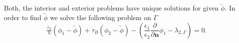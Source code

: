 \begin{itemize}
Both, the interior and exterior problems have unique solutions for given $\widetilde{\phi}$. In order to find $\widetilde{\phi}$ we solve the following problem on $\Gamma$
\begin{equation*}
\tfrac{\tau_F}{h} \left( \phi_1 - \widetilde{\phi}\right) + \tau_B \left( \phi_2 - \widetilde{\phi}\right)  - \left(\frac{\epsilon_1}{\epsilon_2} \frac{\partial}{\partial \mathbf{n}} \phi_1 -\lambda_{2,\Gamma} \right)  = 0.
\end{equation*}
\end{itemize}
